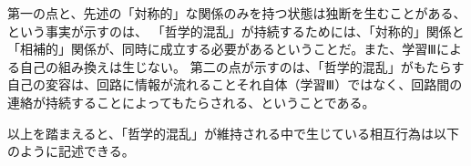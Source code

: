\documentclass[b5j,twoside,twocolumn]{utarticle}
\begin{document}
第一の点と、先述の「対称的」な関係のみを持つ状態は独断を生むことがある、という事実が示すのは、
「哲学的混乱」が持続するためには、「対称的」関係と「相補的」関係が、同時に成立する必要があるということだ。また、学習Ⅲによる自己の組み換えは生じない。
第二の点が示すのは、「哲学的混乱」がもたらす自己の変容は、回路に情報が流れることそれ自体（学習Ⅲ）ではなく、回路間の連絡が持続することによってもたらされる、ということである。












以上を踏まえると、「哲学的混乱」が維持される中で生じている相互行為は以下のように記述できる。
\end{document}
